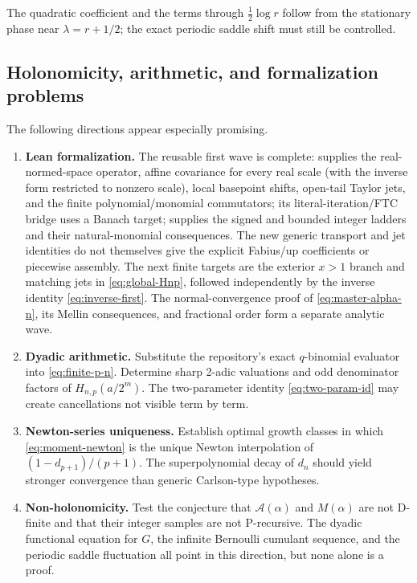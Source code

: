 \documentclass[11pt,oneside]{article}
\theoremstyle{definition}
\theoremstyle{remark}
\newcommand{\1}{\mathbf 1}
\begin{document}
The quadratic coefficient and the terms through \(\frac12\log r\) follow from
the stationary phase near \(\lambda=r+1/2\); the exact periodic saddle shift
must still be controlled.

\subsection{Holonomicity, arithmetic, and formalization problems}
The following directions appear especially promising.
\begin{enumerate}
\item \textbf{Lean formalization.}  The reusable first wave is complete:
 supplies the real-normed-space operator,
affine covariance for every real scale (with the inverse form restricted to
nonzero scale), local basepoint shifts, open-tail Taylor jets, and the finite
polynomial/monomial commutators; its literal-iteration/FTC bridge uses a Banach target;
 supplies the signed and bounded
integer ladders and their natural-monomial consequences.  The new generic
transport and jet identities do not themselves give the explicit Fabius/up
coefficients or piecewise assembly.  The next finite targets are the exterior
\(x>1\) branch and matching jets in
\eqref{eq:global-Hnp}, followed independently by the inverse identity
\eqref{eq:inverse-first}.  The normal-convergence proof of
\eqref{eq:master-alpha-n}, its Mellin consequences, and fractional order form
a separate analytic wave.

\item \textbf{Dyadic arithmetic.}  Substitute the repository's exact
\(q\)-binomial evaluator into \eqref{eq:finite-p-n}.  Determine sharp
2-adic valuations and odd denominator factors of
\(H_{n,p}(a/2^m)\).  The two-parameter identity
\eqref{eq:two-param-id} may create cancellations not visible term by term.

\item \textbf{Newton-series uniqueness.}  Establish optimal growth classes in
which \eqref{eq:moment-newton} is the unique Newton interpolation of
\((1-d_{p+1})/(p+1)\).  The superpolynomial decay of \(d_n\) should yield
stronger convergence than generic Carlson-type hypotheses.

\item \textbf{Non-holonomicity.}  Test the conjecture that
\(\mathcal A(\alpha)\) and \(M(\alpha)\) are not D-finite and that their
integer samples are not P-recursive.  The dyadic functional equation for
\(G\), the infinite Bernoulli cumulant sequence, and the periodic saddle
fluctuation all point in this direction, but none alone is a proof.


\end{enumerate}
\end{document}
